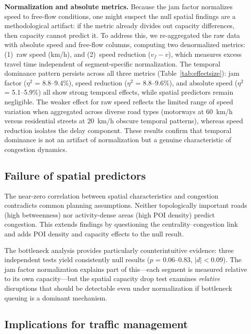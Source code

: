 \documentclass[preprint,12pt,authoryear]{elsarticle}
\begin{document}
\textbf{Normalization and absolute metrics.} Because the jam factor normalizes speed to free-flow conditions, one might suspect the null spatial findings are a methodological artifact: if the metric already divides out capacity differences, then capacity cannot predict it. To address this, we re-aggregated the raw data with absolute speed and free-flow columns, computing two denormalized metrics: (1)~raw speed (km/h), and (2)~speed reduction ($v_f - v$), which measures excess travel time independent of segment-specific normalization. The temporal dominance pattern persists across all three metrics (Table~\ref{tab:effectsize}): jam factor ($\eta^2$ = 8.8--9.4\%), speed reduction ($\eta^2$ = 8.8--9.6\%), and absolute speed ($\eta^2$ = 5.1--5.9\%) all show strong temporal effects, while spatial predictors remain negligible. The weaker effect for raw speed reflects the limited range of speed variation when aggregated across diverse road types (motorways at 60~km/h versus residential streets at 20~km/h obscure temporal patterns), whereas speed reduction isolates the delay component. These results confirm that temporal dominance is not an artifact of normalization but a genuine characteristic of congestion dynamics.

\subsection{Failure of spatial predictors}

The near-zero correlation between spatial characteristics and congestion contradicts common planning assumptions. Neither topologically important roads (high betweenness) nor activity-dense areas (high POI density) predict congestion. This extends findings by \citet{Kirkley2018} questioning the centrality--congestion link and adds POI density and capacity effects to the null result.

The bottleneck analysis provides particularly counterintuitive evidence: three independent tests yield consistently null results ($p$ = 0.06--0.83, $|d| < 0.09$). The jam factor normalization explains part of this---each segment is measured relative to its own capacity---but the spatial capacity drop test examines \emph{relative} disruptions that should be detectable even under normalization if bottleneck queuing is a dominant mechanism.

\subsection{Implications for traffic management}
\end{document}
